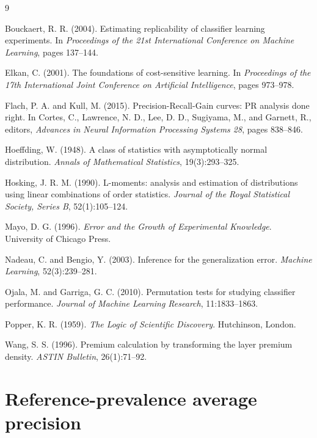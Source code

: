 \documentclass[11pt]{article}
\theoremstyle{remark}
\begin{document}
\begin{thebibliography}{9}

Bouckaert, R. R. (2004).
Estimating replicability of classifier learning experiments.
In \emph{Proceedings of the 21st International Conference on Machine Learning}, pages 137--144.

Elkan, C. (2001).
The foundations of cost-sensitive learning.
In \emph{Proceedings of the 17th International Joint Conference on Artificial Intelligence}, pages 973--978.

Flach, P. A. and Kull, M. (2015).
Precision-Recall-Gain curves: PR analysis done right.
In Cortes, C., Lawrence, N. D., Lee, D. D., Sugiyama, M., and Garnett, R., editors,
\emph{Advances in Neural Information Processing Systems 28}, pages 838--846.

Hoeffding, W. (1948).
A class of statistics with asymptotically normal distribution.
\emph{Annals of Mathematical Statistics}, 19(3):293--325.

Hosking, J. R. M. (1990).
L-moments: analysis and estimation of distributions using linear combinations of order statistics.
\emph{Journal of the Royal Statistical Society, Series B}, 52(1):105--124.

Mayo, D. G. (1996).
\emph{Error and the Growth of Experimental Knowledge}.
University of Chicago Press.

Nadeau, C. and Bengio, Y. (2003).
Inference for the generalization error.
\emph{Machine Learning}, 52(3):239--281.

Ojala, M. and Garriga, G. C. (2010).
Permutation tests for studying classifier performance.
\emph{Journal of Machine Learning Research}, 11:1833--1863.

Popper, K. R. (1959).
\emph{The Logic of Scientific Discovery}.
Hutchinson, London.

Wang, S. S. (1996).
Premium calculation by transforming the layer premium density.
\emph{ASTIN Bulletin}, 26(1):71--92.

\end{thebibliography}


\newpage
\appendix

\section{Reference-prevalence average precision}
\label{app:prevalence}
\end{document}
